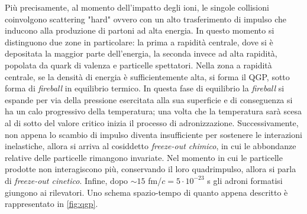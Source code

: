 Più precisamente, al momento dell'impatto degli ioni, le singole collisioni coinvolgono scattering "hard" ovvero con un alto trasferimento di impulso che inducono alla produzione di partoni ad alta energia.
In questo momento si distinguono due zone in particolare: la prima a rapidità centrale, dove si è depositata la maggior parte dell'energia, la seconda invece ad alta rapidità, popolata da quark di valenza e particelle spettatori.
Nella zona a rapidità centrale, se la densità di energia è sufficientemente alta, si forma il QGP, sotto forma di \emph{fireball} in equilibrio termico.
In questa fase di equilibrio la \textit{fireball} si espande per via della pressione esercitata alla sua superficie e di conseguenza si ha un calo progressivo della temperatura; una volta che la temperatura sarà scesa al di sotto del valore critico inizia il processo di adronizzazione.
Successivamente, non appena lo scambio di impulso diventa insufficiente per sostenere le interazioni inelastiche, allora si arriva al cosiddetto \emph{freeze-out chimico}, in cui le abbondanze relative delle particelle rimangono invariate.
Nel momento in cui le particelle prodotte non interagiscono più, conservando il loro quadrimpulso, allora si parla di \emph{freeze-out cinetico}.
Infine, dopo $\sim15$ fm/$c = 5\cdot 10^{-23}$ s gli adroni formatisi giungono ai rilevatori.
Uno schema spazio-tempo di quanto appena descritto è rappresentato in \autoref{fig:qgp}.